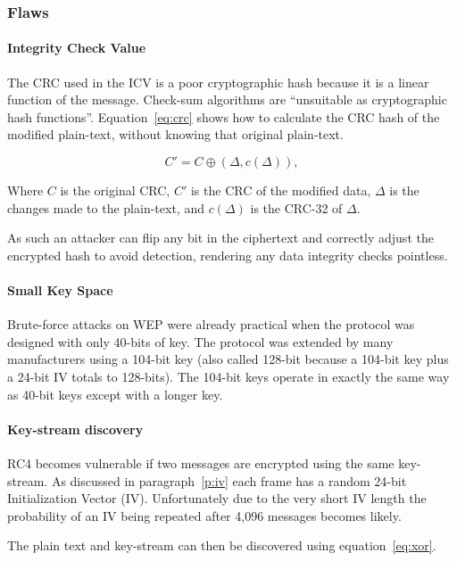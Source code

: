 \documentclass[pdftex, 11pt, a4paper]{article}
\begin{document}
\subsubsection{Flaws}

\paragraph{Integrity Check Value}
The CRC used in the ICV is a poor cryptographic hash because it is a linear function of the message. Check-sum algorithms are ``unsuitable as cryptographic hash functions''\cite{wiki-crc}. Equation~\ref{eq:crc} shows how to calculate the CRC hash of the modified plain-text, without knowing that original plain-text.

\begin{equation}\label{eq:crc}
C'=C \oplus (\Delta ,c(\Delta)),
\end{equation}

Where $C$ is the original CRC, $C'$ is the CRC of the modified data, $\Delta$ is the changes made to the plain-text, and $c(\Delta)$ is the CRC-32 of $\Delta$.

As such an attacker can flip any bit in the ciphertext and correctly adjust the encrypted hash to avoid detection, rendering any data integrity checks pointless.

\paragraph{Small Key Space}
Brute-force attacks on WEP were already practical when the protocol was designed with only 40-bits of key.  The protocol was extended by many manufacturers using a 104-bit key (also called 128-bit because a 104-bit key plus a 24-bit IV totals to 128-bits).  The 104-bit keys operate in exactly the same way as 40-bit keys except with a longer key.

\paragraph{Key-stream discovery}
RC4 becomes vulnerable if two messages are encrypted using the same key-stream.  As discussed in paragraph~\ref{p:iv} each frame has a random 24-bit Initialization Vector (IV).  Unfortunately due to the very short IV length the probability of an IV being repeated after 4,096 messages becomes likely.

The plain text and key-stream can then be discovered using equation~\ref{eq:xor}.
\end{document}
